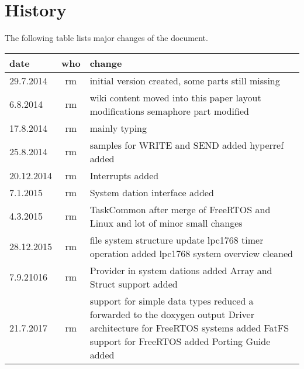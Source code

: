\chapter*{History}
The following table lists major changes of the document.

\begin{tabular}{|l|c|p{10cm}|}
\hline
date & who & change \\
\hline
29.7.2014 & rm & initial version created, some parts still missing \\
6.8.2014 & rm & wiki content moved into this paper \newline
                layout modifications\newline
                semaphore part modified\\
17.8.2014 & rm & mainly typing \\
25.8.2014 & rm & samples for WRITE and SEND added \newline
		 hyperref added\\
20.12.2014 & rm & Interrupts added \\
7.1.2015 & rm & System dation interface added \\
4.3.2015 & rm &  TaskCommon after merge of FreeRTOS and Linux \newline
and lot of minor small changes \\
28.12.2015 & rm & file system structure update \newline
                  lpc1768 timer operation added \newline
                  lpc1768 system overview cleaned \\
7.9.21016 & rm & Provider in system dations added\newline
                 Array and Struct support added\\
21.7.2017 & rm & support for simple data types reduced
                 a forwarded to the doxygen output \newline
                 Driver architecture for FreeRTOS systems added \newline
                 FatFS support for FreeRTOS added \newline
                 Porting Guide added \\
\hline
\end{tabular} 
